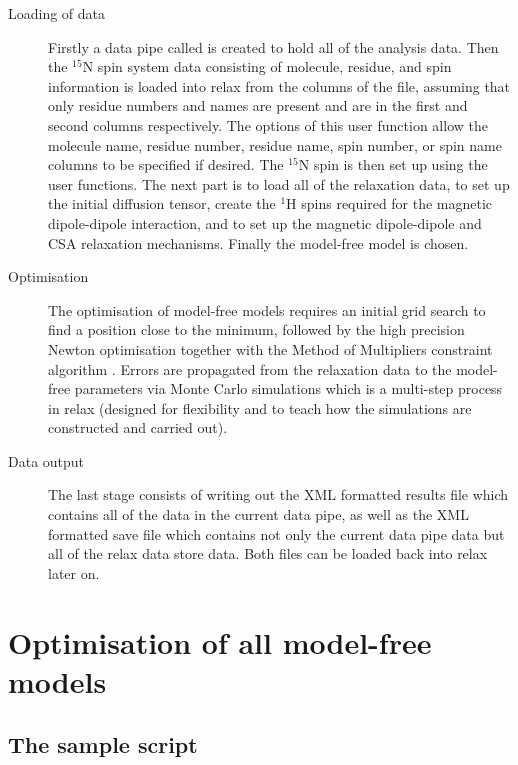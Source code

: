 \begin{htmlonly}
\begin{htmlonly}
\begin{description}
\item[Loading of data] Firstly a data pipe called  is created to hold all of the analysis data.  Then the $^{15}$N spin system data consisting of molecule, residue, and spin information is loaded into relax from the columns of the  file, assuming that only residue numbers and names are present and are in the first and second columns respectively.  The options of this  user function allow the molecule name, residue number, residue name, spin number, or spin name columns to be specified if desired.  The $^{15}$N spin is then set up using the  user functions.  The next part is to load all of the relaxation data, to set up the initial diffusion tensor, create the $^1$H spins required for the magnetic dipole-dipole interaction, and to set up the magnetic dipole-dipole and CSA relaxation mechanisms.  Finally the model-free model  is chosen.
\item[Optimisation] The optimisation of model-free models requires an initial grid search to find a position close to the minimum, followed by the high precision Newton optimisation together with the Method of Multipliers constraint algorithm \citep{dAuvergneGooley08a}.  Errors are propagated from the relaxation data to the model-free parameters via Monte Carlo simulations which is a multi-step process in relax (designed for flexibility and to teach how the simulations are constructed and carried out).
\item[Data output] The last stage consists of writing out the XML formatted results file which contains all of the data in the current data pipe, as well as the XML formatted save file which contains not only the current data pipe data but all of the relax data store data.  Both files can be loaded back into relax later on.
\end{description}




\section{Optimisation of all model-free models}



\subsection{The sample script}


\end{htmlonly}
\end{htmlonly}

